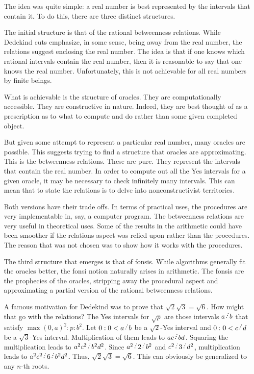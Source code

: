 \documentclass[12pt]{article}
\begin{document}
The idea was quite simple: a real number is best represented by the intervals that contain it. To do this, there are three distinct structures. 

The initial structure is that of the rational betweenness relations. While Dedekind cuts emphasize, in some sense, being away from the real number, the relations suggest enclosing the real number. The idea is that if one knows which rational intervals contain the real number, then it is reasonable to say that one knows the real number. Unfortunately, this is not achievable for all real numbers by finite beings. 

What is achievable is the structure of oracles. They are computationally accessible. They are constructive in nature. Indeed, they are best thought of as a prescription as to what to compute and do rather than some given completed object. 

But given some attempt to represent a particular real number, many oracles are possible. This suggests trying to find a structure that oracles are approximating. This is the betweenness relations. These are pure. They represent the intervals that contain the real number. In order to compute out all the Yes intervals for a given oracle, it may be necessary to check infinitely many intervals. This can mean that to state the relations is to delve into nonconstructivist territories. 

Both versions have their trade offs. In terms of practical uses, the procedures are very implementable in, say, a computer program. The betweenness relations are very useful in theoretical uses. Some of the results in the arithmetic could have been smoother if the relations aspect was relied upon rather than the procedures. The reason that was not chosen was to show how it works with the procedures. 

The third structure that emerges is that of fonsis. While algorithms generally fit the oracles better, the fonsi notion naturally arises in arithmetic. The fonsis are the prophecies of the oracles, stripping away the procedural aspect and approximating a partial version of the rational betweenness relations. 

A famous motivation for Dedekind was to prove that $\sqrt{2} \sqrt{3} = \sqrt{6}$. How might that go with the relations? The Yes intervals for $\sqrt{p}$ are those intervals $a \lte b$ that satisfy $\max(0,a)^2 : p : b^2$. Let $0:0 < a \lte b$ be a $\sqrt{2}$-Yes interval and $0:0 < c\lte d$ be a $\sqrt{3}$-Yes interval. Multiplication of them leads to $ac \lte bd$. Squaring the multiplication leads to $a^2 c^2 \lte b^2 d^2$. Since $a^2 \lte 2 \lte b^2$ and $c^2 \lte 3 \lte d^2$, multiplication leads to $a^2 c^2 \lte 6 \lte b^2 d^2$. Thus, $\sqrt{2} \sqrt{3} = \sqrt{6}$. This can obviously be generalized to any $n$-th roots. 
\end{document}
